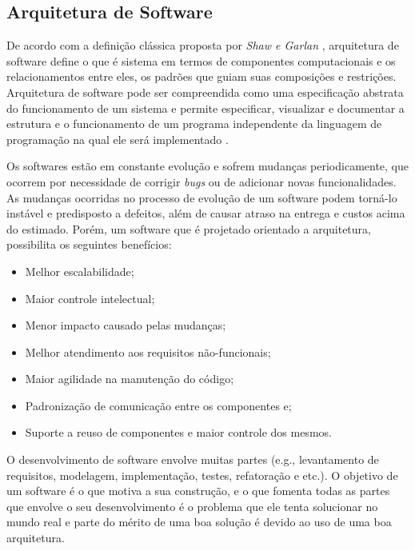 \subsection{Arquitetura de Software} %
De acordo com a definição clássica proposta por \textit{Shaw e Garlan} \cite{shaw_and_garlan}, arquitetura de software define o que é sistema em termos de componentes computacionais e os relacionamentos entre eles, os padrões que guiam suas composições e restrições. Arquitetura de software pode ser compreendida como uma especificação abstrata do funcionamento de um sistema e permite especificar, visualizar e documentar a estrutura e o funcionamento de um programa independente da linguagem de programação na qual ele será implementado \cite{jair_Cavalcanti_leite}.\par

Os softwares estão em constante evolução e sofrem mudanças periodicamente, que ocorrem por necessidade de corrigir \textit{bugs} ou de adicionar novas funcionalidades. As mudanças ocorridas no processo de evolução de um software podem torná-lo instável e predisposto a defeitos, além de causar atraso na entrega e custos acima do estimado. Porém, um software que é projetado orientado a arquitetura, possibilita os seguintes benefícios:
\begin{itemize}
		\item Melhor escalabilidade;
		\item Maior controle intelectual;
		\item Menor impacto causado pelas mudanças;
		\item Melhor atendimento aos requisitos não-funcionais;
		\item Maior agilidade na manutenção do código;
		\item Padronização de comunicação entre os componentes e;
		\item Suporte a reuso de componentes e maior controle dos mesmos.
\end{itemize}

O desenvolvimento de software envolve muitas partes (e.g., levantamento de requisitos, modelagem, implementação, testes, refatoração e etc.). O objetivo de um software é o que motiva a sua construção, e o que fomenta todas as partes que envolve o seu desenvolvimento é o problema que ele tenta solucionar no mundo real e parte do mérito de uma boa solução é devido ao uso de uma boa arquitetura.\par

